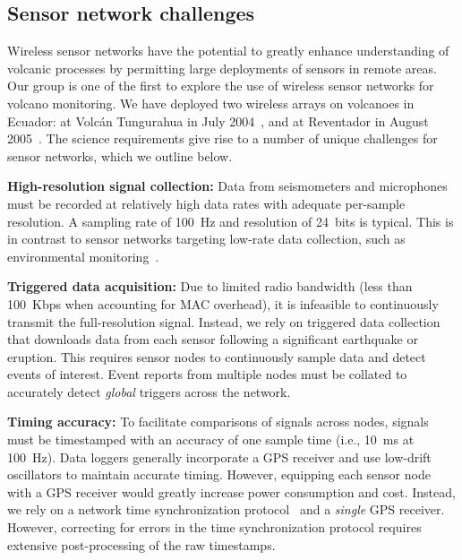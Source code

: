 \subsection{Sensor network challenges}

Wireless sensor networks have the potential to greatly enhance understanding
of volcanic processes by permitting large deployments of sensors in remote
areas.  Our group is one of the first to explore the use of wireless sensor
networks for volcano monitoring. We have deployed two wireless arrays on
volcanoes in Ecuador: at Volc\'{a}n Tungurahua in July
2004~\cite{volcano-ewsn05}, and at Reventador in August
2005~\cite{volcano-ieeeic06}.  The science requirements give rise to a number
of unique challenges for sensor networks, which we outline below.

{\bf High-resolution signal collection:}
Data from seismometers and microphones must be recorded at relatively high
data rates with adequate per-sample resolution.  A sampling rate of 100~Hz
and resolution of 24~bits is typical.  This is in contrast to sensor networks
targeting low-rate data collection, such as environmental
monitoring~\cite{gdi-sensys04,berkeley-redwoods}.

{\bf Triggered data acquisition:}
Due to limited radio bandwidth (less than 100~Kbps when accounting for MAC
overhead), it is infeasible to continuously transmit the full-resolution
signal.  Instead, we rely on triggered data collection that downloads data
from each sensor following a significant earthquake or eruption. This
requires sensor nodes to continuously sample data and detect events of
interest.  Event reports from multiple nodes must be collated to accurately
detect {\em global} triggers across the network.

{\bf Timing accuracy:} 
To facilitate comparisons of signals across nodes, signals must be
timestamped with an accuracy of one sample time (i.e., 10~ms at 100~Hz).
Data loggers generally incorporate a GPS receiver and use low-drift
oscillators to maintain accurate timing. However, equipping each sensor node
with a GPS receiver would greatly increase power consumption and cost.
Instead, we rely on a network time synchronization protocol~\cite{rbs,ftsp}
and a {\em single} GPS receiver. However, correcting for errors in the time
synchronization protocol requires extensive post-processing of the raw
timestamps.


